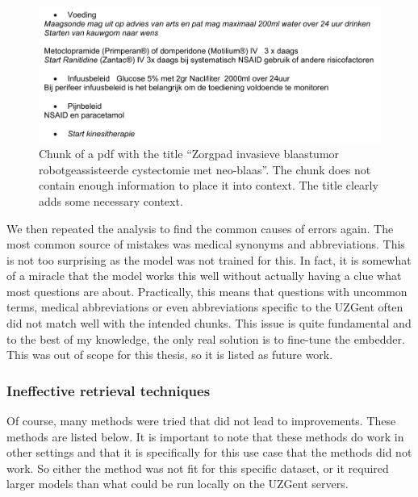 \begin{figure}[h]
    \centerline{\includegraphics[width=1\linewidth]{fig/out_of_context_zenya_doc.png}}
    \caption{Chunk of a pdf with the title ``Zorgpad invasieve blaastumor robotgeassisteerde cystectomie met neo-blaas''. The chunk does not contain enough information to place it into context. The title clearly adds some necessary context.}
    \label{fig:out_of_context_zenya_doc}
\end{figure}

We then repeated the analysis to find the common causes of errors again. The most common source of mistakes was medical synonyms and abbreviations. This is not too surprising as the model was not trained for this. In fact, it is somewhat of a miracle that the model works this well without actually having a clue what most questions are about. Practically, this means that questions with uncommon terms, medical abbreviations or even abbreviations specific to the UZGent often did not match well with the intended chunks. This issue is quite fundamental and to the best of my knowledge, the only real solution is to fine-tune the embedder. This was out of scope for this thesis, so it is listed as future work.

\subsubsection{Ineffective retrieval techniques}
Of course, many methods were tried that did not lead to improvements. These methods are listed below. It is important to note that these methods do work in other settings and that it is specifically for this use case that the methods did not work. So either the method was not fit for this specific dataset, or it required larger models than what could be run locally on the UZGent servers.

\FloatBarrier

